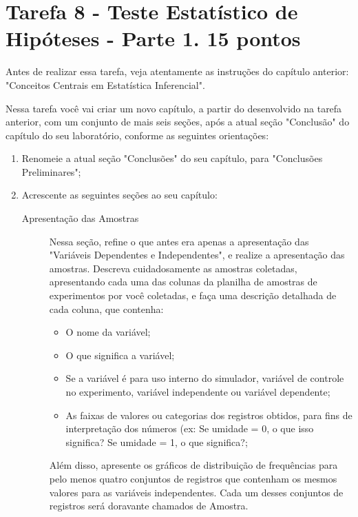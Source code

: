 \chapter{Tarefa 8 - Teste Estatístico de Hipóteses - Parte 1. 15 pontos\label{tarefa:teste:hipotese:R}}

Antes de realizar essa tarefa, veja atentamente as instruções do capítulo anterior: "Conceitos Centrais em Estatística Inferencial".

Nessa tarefa você vai criar um novo capítulo, a partir do desenvolvido na tarefa anterior, com um conjunto de mais seis seções, após a atual seção "Conclusão" do capítulo do seu laboratório, conforme as seguintes orientações:
\begin{enumerate}
    \item Renomeie a atual seção "Conclusões" do seu capítulo, para "Conclusões Preliminares"; 
    \item Acrescente as seguintes seções ao seu capítulo:
    \begin{description}
        \item [Apresentação das Amostras] Nessa seção, refine o que antes era apenas a apresentação das "Variáveis Dependentes e Independentes", e realize a apresentação das amostras. 
        Descreva cuidadosamente as amostras coletadas, apresentando cada uma das colunas da planilha de amostras de experimentos por você coletadas, e faça uma descrição detalhada de cada coluna, que contenha:
        \begin{itemize}
            \item O nome da variável;
            \item O que significa a variável;
            \item Se a variável é para uso interno do simulador, variável de controle no experimento, variável independente ou variável dependente;
            \item As faixas de valores ou categorias dos registros obtidos, para fins de interpretação dos números (ex: Se umidade = 0, o que isso significa? Se umidade = 1, o que significa?;
        \end{itemize}
        
        Além disso, apresente os gráficos de distribuição de frequências para pelo menos quatro conjuntos de registros que contenham os mesmos valores para as variáveis independentes. Cada um desses conjuntos de registros será doravante chamados de Amostra.
        

\end{description}
\end{enumerate}
